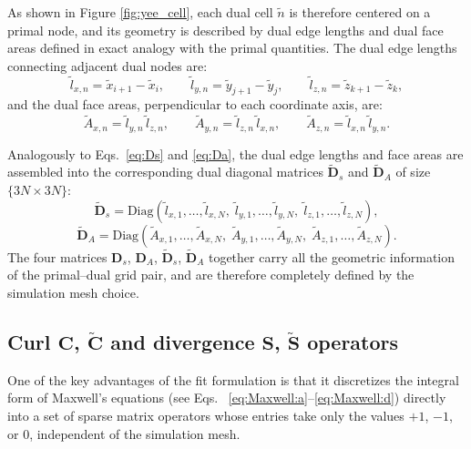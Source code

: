 As shown in Figure \ref{fig:yee_cell}, each dual cell $\tilde{n}$ is therefore centered on a primal node, and its geometry is described by dual edge lengths and dual face areas defined in exact analogy with the primal quantities. The dual edge lengths connecting adjacent dual nodes are:
\begin{equation}
\tilde{l}_{x,n} = \tilde{x}_{i+1} - \tilde{x}_i, \qquad
\tilde{l}_{y,n} = \tilde{y}_{j+1} - \tilde{y}_j, \qquad
\tilde{l}_{z,n} = \tilde{z}_{k+1} - \tilde{z}_k,
\end{equation}
and the dual face areas, perpendicular to each coordinate axis, are:
\begin{equation}
\tilde{A}_{x,n} = \tilde{l}_{y,n}\,\tilde{l}_{z,n}, \qquad
\tilde{A}_{y,n} = \tilde{l}_{z,n}\,\tilde{l}_{x,n}, \qquad
\tilde{A}_{z,n} = \tilde{l}_{x,n}\,\tilde{l}_{y,n}.
\end{equation}

Analogously to Eqs.~\eqref{eq:Ds} and \eqref{eq:Da}, the dual edge lengths and face areas are assembled into the corresponding dual diagonal matrices $\widetilde{\mathbf{D}}_s$ and $\widetilde{\mathbf{D}}_A$ of size $\{3N\times3N\}$:
\begin{equation}
\widetilde{\mathbf{D}}_s = \mathrm{Diag}
\!\left(\tilde{l}_{x,1},\ldots,\tilde{l}_{x,N},\;
\tilde{l}_{y,1},\ldots,\tilde{l}_{y,N},\;
\tilde{l}_{z,1},\ldots,\tilde{l}_{z,N}\right),
\end{equation}
\begin{equation}
\widetilde{\mathbf{D}}_A = \mathrm{Diag}
\!\left(\tilde{A}_{x,1},\ldots,\tilde{A}_{x,N},\;
\tilde{A}_{y,1},\ldots,\tilde{A}_{y,N},\;
\tilde{A}_{z,1},\ldots,\tilde{A}_{z,N}\right).
\end{equation}
The four matrices $\mathbf{D}_s$, $\mathbf{D}_A$, $\widetilde{\mathbf{D}}_s$, $\widetilde{\mathbf{D}}_A$ together carry all the geometric information of the primal--dual grid pair, and are therefore completely defined by the simulation mesh choice.


\subsection{Curl $\mathbf{C}$, $\widetilde{\mathbf{C}}$ and divergence $\mathbf{S}$, $\widetilde{\mathbf{S}}$ operators}
\label{sec:mge_operators}

One of the key advantages of the \gls{fit} formulation is that it discretizes the integral form of Maxwell's equations (see Eqs. ~\eqref{eq:Maxwell:a}--\eqref{eq:Maxwell:d}) directly into a set of sparse matrix operators whose entries take only the values $+1$, $-1$, or $0$, independent of the simulation mesh.

